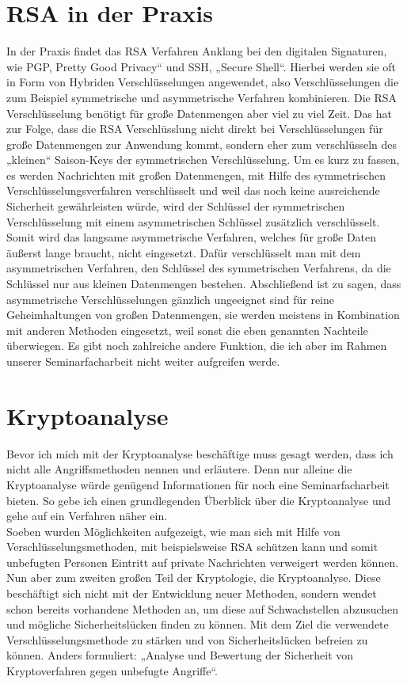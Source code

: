 \section{RSA in der Praxis}
In der Praxis findet das RSA Verfahren Anklang bei den digitalen Signaturen, wie PGP, Pretty Good Privacy“ und SSH, „Secure Shell“. Hierbei werden sie oft in Form von Hybriden Verschlüsselungen angewendet, also Verschlüsselungen die zum Beispiel symmetrische und asymmetrische Verfahren kombinieren. Die RSA Verschlüsselung benötigt für große Datenmengen aber viel zu viel Zeit. Das hat zur Folge, dass die RSA Verschlüsslung nicht direkt bei Verschlüsselungen für große Datenmengen zur Anwendung kommt, sondern eher zum verschlüsseln des „kleinen“ Saison-Keys der symmetrischen Verschlüsselung. Um es kurz zu fassen, es werden Nachrichten mit großen Datenmengen, mit Hilfe des symmetrischen Verschlüsselungsverfahren verschlüsselt und weil das noch keine ausreichende Sicherheit gewährleisten würde, wird der Schlüssel der symmetrischen Verschlüsselung mit einem asymmetrischen Schlüssel zusätzlich verschlüsselt. Somit wird das langsame asymmetrische Verfahren, welches für große Daten äußerst lange braucht, nicht eingesetzt. Dafür verschlüsselt man mit dem asymmetrischen Verfahren, den Schlüssel des symmetrischen Verfahrens, da die Schlüssel nur aus kleinen Datenmengen bestehen. Abschließend ist zu sagen, dass asymmetrische Verschlüsselungen gänzlich ungeeignet sind für reine Geheimhaltungen von großen Datenmengen, sie werden meistens in Kombination mit anderen Methoden eingesetzt, weil sonst die eben genannten Nachteile überwiegen. Es gibt noch zahlreiche andere Funktion, die ich aber im Rahmen unserer Seminarfacharbeit nicht weiter aufgreifen werde.

\section{Kryptoanalyse}
Bevor ich mich mit der Kryptoanalyse beschäftige muss gesagt werden, dass ich nicht alle Angriffsmethoden nennen und erläutere. Denn nur alleine die Kryptoanalyse würde genügend Informationen für noch eine Seminarfacharbeit bieten. So gebe ich einen grundlegenden Überblick über die Kryptoanalyse und gehe auf ein Verfahren näher ein.\\

Soeben wurden Möglichkeiten aufgezeigt, wie man sich mit Hilfe von Verschlüsselungsmethoden, mit beispielsweise RSA schützen kann und somit unbefugten Personen Eintritt auf private Nachrichten verweigert werden können. Nun aber zum zweiten großen Teil der Kryptologie, die Kryptoanalyse. Diese beschäftigt sich nicht mit der Entwicklung neuer Methoden, sondern wendet schon bereits vorhandene Methoden an, um diese auf Schwachstellen abzusuchen und mögliche Sicherheitslücken finden zu können. Mit dem Ziel die verwendete Verschlüsselungsmethode zu stärken und von Sicherheitslücken befreien zu können. Anders formuliert: „Analyse und Bewertung der Sicherheit von Kryptoverfahren gegen unbefugte Angriffe“.\\

